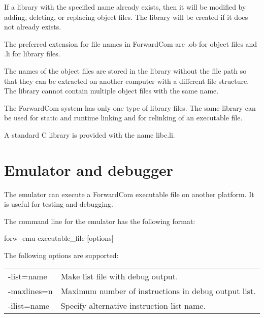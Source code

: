 \documentclass[forwardcom.tex]{subfiles}
\begin{document}
If a library with the specified name already exists, then it will be modified by adding, deleting, or replacing object files. The library will be created if it does not already exists.
\vspace{2mm}

The preferred extension for file names in ForwardCom are .ob for object files and .li for library files.
\vspace{2mm}

The names of the object files are stored in the library without the file path so that they can be extracted on another computer with a different file structure. The library cannot contain multiple object files with the same name.
\vspace{2mm}

The ForwardCom system has only one type of library files. The same library can be used for static and runtime linking and for relinking of an executable file.
\vspace{2mm}

A standard C library is provided with the name libc.li.
\vspace{2mm}

\section{Emulator and debugger} \label{emulator}

The emulator can execute a ForwardCom executable file on another platform. It is useful for testing and debugging.
\vspace{2mm}

The command line for the emulator has the following format:
\vspace{2mm}

\hspace{5mm} {\ttfamily forw -emu executable\_file [options]}
\vspace{2mm}

\vspace{2mm}
The following options are supported:\\
\begin{tabular}{|p{22mm}p{140mm}|}
\hline
-list=name & Make list file with debug output.\\
-maxlines=n & Maximum number of instructions in debug output list.\\
-ilist=name & Specify alternative instruction list name.\\
\hline
\end{tabular}
\vspace{2mm}
\end{document}
